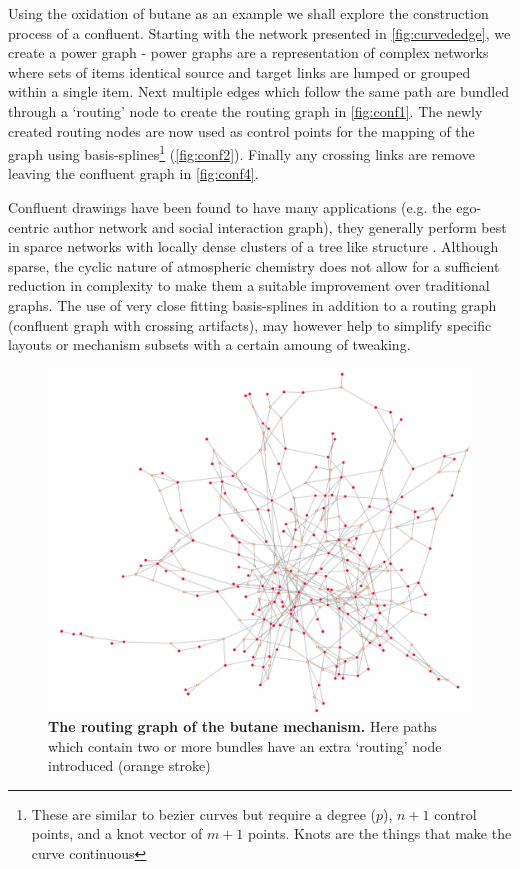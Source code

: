 Using the oxidation of butane as an example we shall explore the construction process of a confluent. Starting with the network presented in \autoref{fig:curvededge}, we create a power graph - 
power graphs are a representation of complex networks where sets of items identical source and target links are lumped or grouped within a single item. Next multiple edges which follow the same path are bundled through a `routing' node to create the routing graph in \autoref{fig:conf1}. The newly created routing nodes are now used as control points for the mapping of the graph using basis-splines\footnote{These are similar to bezier curves but require a degree ($p$), $n+1$ control points, and a knot vector of $m+1$ points. Knots are the things that make the curve continuous } (\autoref{fig:conf2}). Finally any crossing links are remove leaving the confluent graph in \autoref{fig:conf4}. 

Confluent drawings have been found to have many applications (e.g. the ego-centric author network and social interaction graph), they generally perform best in sparce networks with locally dense clusters of a tree like structure \citep{confluent17}. Although sparse, the cyclic nature of atmospheric chemistry does not allow for a sufficient reduction in complexity to make them a suitable improvement over traditional graphs. The use of very close fitting basis-splines in addition to a routing graph (confluent graph with crossing artifacts), may however help to simplify specific layouts or mechanism subsets with a certain amoung of tweaking. 

\begin{figure}[H]
     \centering
     \includegraphics[width=.8\textwidth]{figures_c1/layout/confluent/1.png}
        \caption{\textbf{The routing graph of the butane mechanism.} Here paths which contain two or more bundles have an extra `routing' node introduced (orange stroke) }
      \label{fig:conf1}
\end{figure}

